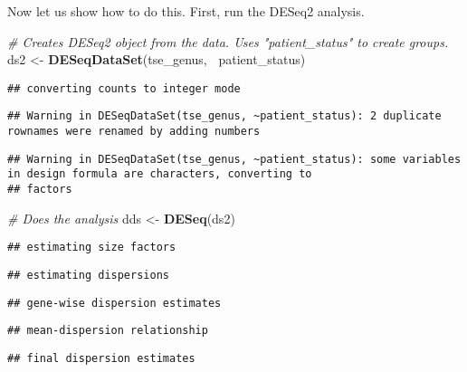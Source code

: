 \documentclass[
  oneside]{book}
\newenvironment{Shaded}{\begin{snugshade}}{\end{snugshade}}
\newcommand{\CommentTok}[1]{\textcolor[rgb]{0.56,0.35,0.01}{\textit{#1}}}
\newcommand{\KeywordTok}[1]{\textcolor[rgb]{0.13,0.29,0.53}{\textbf{#1}}}
\newcommand{\NormalTok}[1]{#1}
\newcommand{\OperatorTok}[1]{\textcolor[rgb]{0.81,0.36,0.00}{\textbf{#1}}}
\newcommand{\StringTok}[1]{\textcolor[rgb]{0.31,0.60,0.02}{#1}}
\begin{document}
Now let us show how to do this. First, run the DESeq2 analysis.

\begin{Shaded}
\begin{Highlighting}[]
\CommentTok{# Creates DESeq2 object from the data. Uses "patient_status" to create groups. }
\NormalTok{ds2 <-}\StringTok{ }\KeywordTok{DESeqDataSet}\NormalTok{(tse_genus, }\OperatorTok{~}\NormalTok{patient_status)}
\end{Highlighting}
\end{Shaded}

\begin{verbatim}
## converting counts to integer mode
\end{verbatim}

\begin{verbatim}
## Warning in DESeqDataSet(tse_genus, ~patient_status): 2 duplicate rownames were renamed by adding numbers
\end{verbatim}

\begin{verbatim}
## Warning in DESeqDataSet(tse_genus, ~patient_status): some variables in design formula are characters, converting to
## factors
\end{verbatim}

\begin{Shaded}
\begin{Highlighting}[]
\CommentTok{# Does the analysis}
\NormalTok{dds <-}\StringTok{ }\KeywordTok{DESeq}\NormalTok{(ds2)}
\end{Highlighting}
\end{Shaded}

\begin{verbatim}
## estimating size factors
\end{verbatim}

\begin{verbatim}
## estimating dispersions
\end{verbatim}

\begin{verbatim}
## gene-wise dispersion estimates
\end{verbatim}

\begin{verbatim}
## mean-dispersion relationship
\end{verbatim}

\begin{verbatim}
## final dispersion estimates
\end{verbatim}
\end{document}
